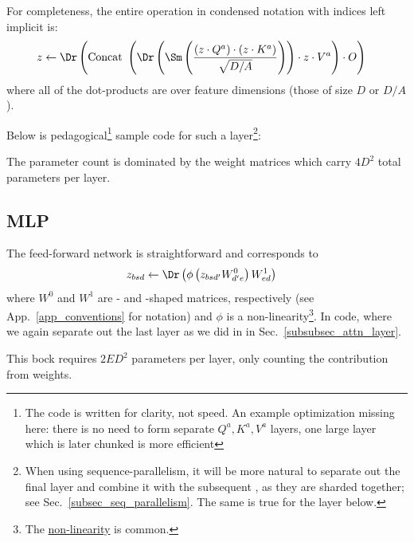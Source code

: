 \documentclass[11pt]{article}
\begin{document}
For completeness, the entire operation in condensed notation with indices left implicit is:
\begin{align}
    z  &\leftarrow \Dr \left ({\rm Concat} \ \left ( \Dr \left (\Sm  \left ( \frac{ \left ( z \cdot Q ^{ a } \right )\cdot \left ( z \cdot K ^{ a } \right )}{ \sqrt{D/A} }
            \right)\right )\cdot z \cdot V ^{ a } \right ) \cdot O \right ) \label{eq_causal_attn}
\end{align}
where all of the dot-products are over feature dimensions (those of size $ D $ or $ D/A $).

Below is pedagogical\footnote{The
code is written for clarity, not speed. An example optimization missing here: there is no need to
form separate $ Q ^{ a },K ^{ a },V ^{ a} $  layers, one large layer which is later
chunked is more efficient} sample code for such a   layer\footnote{When
using sequence-parallelism, it will be more natural to separate out the final  layer
and combine it with the subsequent , as they are sharded together; see
Sec.~\ref{subsec_seq_parallelism}. The same is true for the  layer below.}:

The parameter count is dominated by the weight matrices which carry $ 4 D ^{ 2 } $ total parameters per layer.


\subsection{MLP \label{subsubsec_mlp} }

The feed-forward network is straightforward and corresponds to
\begin{align}
  z _{ bsd } &\leftarrow \Dr \left (\phi \left ( z _{ bsd' }W ^{ 0 }_{ d'e } \right ) W ^{ 1 } _{ ed
      } \right ) \label{eq_mlp}
\end{align}
where $ W ^{ 0 } $ and $ W ^{ 1 } $ are - and -shaped matrices,
respectively (see App.~\ref{app_conventions} for notation) and $ \phi $ is a
non-linearity\footnote{The 
\href{https://pytorch.org/docs/stable/generated/torch.nn.GELU.html}{non-linearity} is common.}.
In code, where we again separate out the last  layer as we did in in
Sec.~\ref{subsubsec_attn_layer}.  

This bock requires $ 2 E D ^{ 2 } $ parameters per layer, only counting the contribution from
weights.
\end{document}
